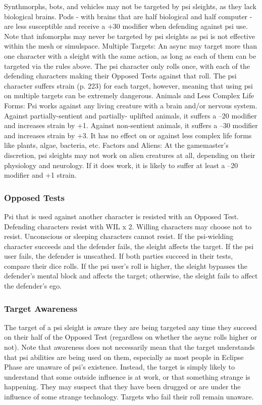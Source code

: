 Synthmorphs, bots, and vehicles may not be targeted by psi sleights, as they lack biological brains. Pods - with brains that are half biological and half computer - are less susceptible and receive a +30 modifier when defending against psi use. Note that infomorphs may never be targeted by psi sleights as psi is not effective within the mesh or simulspace. Multiple Targets: An async may target more than one character with a sleight with the same action, as long as each of them can be targeted via the rules above. The psi character only rolls once, with each of the defending characters making their Opposed Tests against that roll. The psi character suffers strain (p. 223) for each target, however, meaning that using psi on multiple targets can be extremely dangerous. Animals and Less Complex Life Forms: Psi works against any living creature with a brain and/or nervous system. Against partially-sentient and partially- uplifted animals, it suffers a –20 modifier and increases strain by +1. Against non-sentient animals, it suffers a –30 modifier and increases strain by +3. It has no effect on or against less complex life forms like plants, algae, bacteria, etc. Factors and Aliens: At the gamemaster’s discretion, psi sleights may not work on alien creatures at all, depending on their physiology and neurology. If it does work, it is likely to suffer at least a –20 modifier and +1 strain. 

\subsubsection{Opposed Tests} 

Psi that is used against another character is resisted with an Opposed Test. Defending characters resist with WIL x 2. Willing characters may choose not to resist. Unconscious or sleeping characters cannot resist. If the psi-wielding character succeeds and the defender fails, the sleight affects the target. If the psi user fails, the defender is unscathed. If both parties succeed in their tests, compare their dice rolls. If the psi user’s roll is higher, the sleight bypasses the defender’s mental block and affects the target; otherwise, the sleight fails to affect the defender’s ego. 

\subsubsection{Target Awareness} 

The target of a psi sleight is aware they are being targeted any time they succeed on their half of the Opposed Test (regardless on whether the async rolls higher or not). Note that awareness does not necessarily mean that the target understands that psi abilities are being used on them, especially as most people in Eclipse Phase are unaware of psi’s existence. Instead, the target is simply likely to understand that some outside influence is at work, or that something strange is happening. They may suspect that they have been drugged or are under the influence of some strange technology. Targets who fail their roll remain unaware. 

